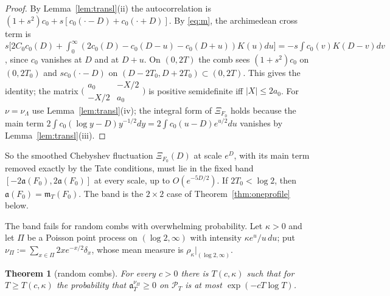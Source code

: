 \documentclass[11pt]{amsart}
\newtheorem{theorem}{Theorem}[section]
\theoremstyle{definition}
\theoremstyle{remark}
\newcommand{\PT}{\mathcal P_T}
\newcommand{\mT}{\mathfrak m_T}
\begin{document}
\begin{proof}
By Lemma~\ref{lem:transl}(ii) the autocorrelation is $(1+s^2)c_0+s[c_0(\cdot-D)+c_0(\cdot+D)]$. By \eqref{eq:m}, the archimedean cross
term is $s\big[2C_0c_0(D)+\int_0^\infty(2c_0(D)-c_0(D-u)-c_0(D+u))K(u)du\big]=-s\int c_0(v)K(D-v)dv$, since $c_0$ vanishes at $D$ and at
$D+u$. On $(0,2T)$ the comb sees $(1+s^2)c_0$ on $(0,2T_0)$ and $sc_0(\cdot-D)$ on $(D-2T_0,D+2T_0)\subset(0,2T)$. This gives the
identity; the matrix $\big(\begin{smallmatrix}a_0&-X/2\\-X/2&a_0\end{smallmatrix}\big)$ is positive semidefinite iff $|X|\le2a_0$. For
$\nu=\nu_\Lambda$ use Lemma~\ref{lem:transl}(iv); the integral form of $\Xi_{F_0}$ holds because the main term
$2\int c_0(\log y-D)y^{-1/2}dy=2\int c_0(u-D)e^{u/2}du$ vanishes by Lemma~\ref{lem:transl}(iii).
\end{proof}

So the smoothed Chebyshev fluctuation $\Xi_{F_0}(D)$ at scale $e^D$, with its main term removed exactly by the Tate conditions, must
lie in the fixed band $[-2\mathfrak a(F_0),2\mathfrak a(F_0)]$ at every scale, up to $O(e^{-5D/2})$. If $2T_0<\log2$, then
$\mathfrak a(F_0)=\mT(F_0)$. The band is the $2\times2$ case of Theorem~\ref{thm:oneprofile} below.

The band fails for random combs with overwhelming probability. Let $\kappa>0$ and let $\Pi$ be a Poisson point process on
$(\log2,\infty)$ with intensity $\kappa e^u/u\,du$; put $\nu_\Pi:=\sum_{x\in\Pi}2xe^{-x/2}\delta_x$, whose mean measure is
$\rho_\kappa|_{(\log2,\infty)}$.

\begin{theorem}[random combs]\label{thm:poisson}
For every $c>0$ there is $T(c,\kappa)$ such that for $T\ge T(c,\kappa)$ the probability that $\mathfrak a^{\nu_\Pi}_T\ge0$ on $\PT$ is at
most $\exp(-cT\log T)$.
\end{theorem}
\end{document}
